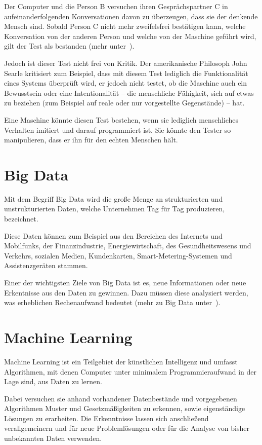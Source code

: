 Der Computer und die Person B versuchen ihren Gesprächspartner C in aufeinanderfolgenden Konversationen davon zu
überzeugen, dass sie der denkende Mensch sind. Sobald Person C nicht mehr zweifelsfrei bestätigen kann, welche
Konversation von der anderen Person und welche von der Maschine geführt wird, gilt der Test als bestanden (mehr
unter~\cite{online_grundlagen_turing}).

Jedoch ist dieser Test nicht frei von Kritik. Der amerikanische Philosoph John Searle kritisiert zum Beispiel, dass mit
diesem Test lediglich die Funktionalität eines Systems überprüft wird, er jedoch nicht testet, ob die Maschine auch ein
Bewusstsein oder eine Intentionalität -- die menschliche Fähigkeit, sich auf etwas zu beziehen (zum Beispiel auf reale
oder nur vorgestellte Gegenstände) -- hat.

Eine Maschine könnte diesen Test bestehen, wenn sie lediglich menschliches Verhalten imitiert und darauf programmiert
ist. Sie könnte den Tester so manipulieren, dass er ihn für den echten Menschen hält.

\section{Big Data}
Mit dem Begriff Big Data wird die große Menge an strukturierten und unstrukturierten Daten, welche Unternehmen Tag für
Tag produzieren, bezeichnet.

Diese Daten können zum Beispiel aus den Bereichen des Internets und Mobilfunks, der Finanzindustrie, Energiewirtschaft,
des Gesundheitswesens und Verkehrs, sozialen Medien, Kundenkarten, Smart-Metering-Systemen und Assistenzgeräten stammen.

Einer der wichtigsten Ziele von Big Data ist es, neue Informationen oder neue Erkentnisse aus den Daten zu gewinnen.
Dazu müssen diese analysiert werden, was erheblichen Rechenaufwand bedeutet (mehr zu Big Data
unter~\cite{book_grundlagen_bigdata}).

\section{Machine Learning}
Machine Learning ist ein Teilgebiet der künstlichen Intelligenz und umfasst Algorithmen, mit denen Computer unter
minimalem Programmieraufwand in der Lage sind, aus Daten zu lernen.

Dabei versuchen sie anhand vorhandener Datenbestände und vorgegebenen Algorithmen Muster und Gesetzmäßigkeiten zu
erkennen, sowie eigenständige Lösungen zu erarbeiten. Die Erkenntnisse lassen sich anschließend verallgemeinern und für
neue Problemlösungen oder für die Analyse von bisher unbekannten Daten verwenden.

